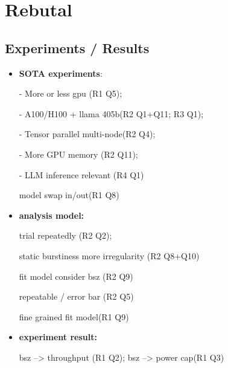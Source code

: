 \newpage

\section{Rebutal}

\subsection{Experiments / Results}

\begin{itemize}
\item \textbf{SOTA experiments}:

- More or less gpu (R1 Q5); 

- A100/H100 + llama 405b(R2 Q1+Q11; R3 Q1); 

- Tensor parallel multi-node(R2 Q4); 

- More GPU memory (R2 Q11); 

- LLM inference relevant (R4 Q1)

model swap in/out(R1 Q8)


\item \textbf{analysis model:} 

trial repeatedly (R2 Q2); 

static burstiness more irregularity (R2 Q8+Q10)

fit model consider bsz (R2 Q9)

repeatable / error bar (R2 Q5)

fine grained fit model(R1 Q9)



\item \textbf{experiment result:} 

bsz --> throughput (R1 Q2);  bsz --> power cap(R1 Q3)

\end{itemize}









